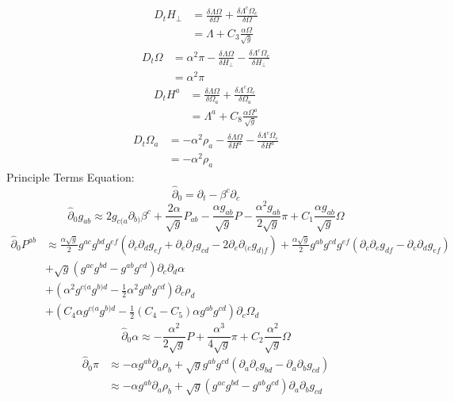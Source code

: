 \documentclass{article}
\begin{document}
\begin{align*}
D_{t}H_{\perp} & = \frac{\delta \Lambda \Omega}{\delta \Omega} + \frac{\delta \Lambda^{c}\Omega_{c}}{\delta \Omega}\\
& = \Lambda + C_{3}\frac{\alpha \Omega}{\sqrt{g}}
\end{align*}
\begin{align*}
D_{t}\Omega & = \alpha^{2}\pi - \frac{\delta \Lambda \Omega}{\delta H_{\perp}} - \frac{\delta \Lambda^{c}\Omega_{c}}{\delta H_{\perp}}\\
& = \alpha^{2}\pi 
\end{align*}
\begin{align*}
D_{t}H^{a} & = \frac{\delta \Lambda\Omega}{\delta \Omega_{a}} + \frac{\delta \Lambda^{c}\Omega_{c} }{\delta \Omega_{a}}\\
& = \Lambda^{a} + C_{8}\frac{\alpha \Omega^{a}}{\sqrt{g}}
\end{align*}
\begin{align*}
D_{t}\Omega_{a} & = -\alpha^{2}\rho_{a} - \frac{\delta \Lambda\Omega}{\delta H^{a}} - \frac{\delta \Lambda^{c}\Omega_{c}}{\delta H^{a}}\\
& = -\alpha^{2}\rho_{a}
\end{align*}
Principle Terms Equation:
\[
{\hat \partial}_{0} = \partial_{t} - \beta^{c}\partial_{c}
\]
\[
{\hat \partial}_{0}g_{ab} \approx 2g_{c(a}\partial_{b)}\beta^{c} + \frac{2\alpha}{\sqrt{g}}P_{ab} - \frac{\alpha g_{ab}}{\sqrt{g}}P - \frac{\alpha^{2}g_{ab}}{2\sqrt{g}}\pi + C_{1}\frac{\alpha g_{ab}}{\sqrt{g}}\Omega
\]
\begin{align*}
{\hat \partial}_{0}P^{ab} & \approx \frac{\alpha \sqrt{g}}{2}g^{ac}g^{bd}g^{ef}\left(\partial_{c}\partial_{d}g_{ef} + \partial_{e}\partial_{f}g_{cd} - 2\partial_{e}\partial_{(c}g_{d)f}\right) + \frac{\alpha \sqrt{g}}{2}g^{ab}g^{cd}g^{ef}\left(\partial_{c}\partial_{e}g_{df} - \partial_{c}\partial_{d}g_{ef}\right)\\
& + \sqrt{g}\left(g^{ac}g^{bd} - g^{ab}g^{cd}\right)\partial_{c}\partial_{d}\alpha\\
& + \left(\alpha^{2}g^{c(a}g^{b)d} - \frac{1}{2}\alpha^{2}g^{ab}g^{cd}\right)\partial_{c}\rho_{d}\\
& + \left(C_{4}\alpha g^{c(a}g^{b)d} - \frac{1}{2}(C_{4} - C_{5})\alpha g^{ab}g^{cd}\right)\partial_{c}\Omega_{d}
\end{align*}
\[
{\hat \partial}_{0}\alpha \approx -\frac{\alpha^{2}}{2\sqrt{g}}P + \frac{\alpha^{3}}{4\sqrt{g}}\pi + C_{2}\frac{\alpha^{2}}{\sqrt{g}}\Omega
\]
\begin{align*}
{\hat \partial}_{0}\pi & \approx  -\alpha g^{ab}\partial_{a}\rho_{b} + \sqrt{g}g^{ab}g^{cd}\left(\partial_{a}\partial_{c}g_{bd} - \partial_{a}\partial_{b}g_{cd}\right)\\
& \approx  -\alpha g^{ab}\partial_{a}\rho_{b} + \sqrt{g}\left(g^{ac}g^{bd} - g^{ab}g^{cd}\right)\partial_{a}\partial_{b}g_{cd}
\end{align*}
\end{document}
